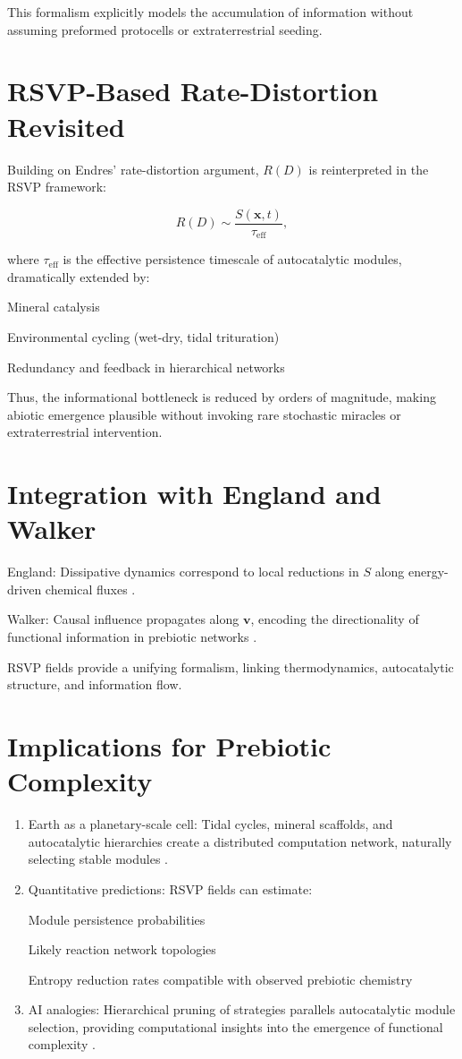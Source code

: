 \documentclass{book}
\begin{document}
This formalism explicitly models the accumulation of information without assuming preformed protocells or extraterrestrial seeding.

\section{RSVP-Based Rate-Distortion Revisited}
Building on Endres’ rate-distortion argument, $R(D)$ is reinterpreted in the RSVP framework:

\[R(D) \sim \frac{S(\mathbf{x}, t)}{\tau_{\mathrm{eff}}},\]

where $\tau_{\mathrm{eff}}$ is the effective persistence timescale of autocatalytic modules, dramatically extended by:

Mineral catalysis \citep{hazen2005}

Environmental cycling (wet-dry, tidal trituration)

Redundancy and feedback in hierarchical networks \citep{peng2022}

Thus, the informational bottleneck is reduced by orders of magnitude, making abiotic emergence plausible without invoking rare stochastic miracles or extraterrestrial intervention.

\section{Integration with England and Walker}
England: Dissipative dynamics correspond to local reductions in $S$ along energy-driven chemical fluxes \citep{england2015}.

Walker: Causal influence propagates along $\mathbf{v}$, encoding the directionality of functional information in prebiotic networks \citep{walker2017}.

RSVP fields provide a unifying formalism, linking thermodynamics, autocatalytic structure, and information flow.

\section{Implications for Prebiotic Complexity}
\begin{enumerate}
\item Earth as a planetary-scale cell: Tidal cycles, mineral scaffolds, and autocatalytic hierarchies create a distributed computation network, naturally selecting stable modules \citep{plum2025}.
\item Quantitative predictions: RSVP fields can estimate:

Module persistence probabilities

Likely reaction network topologies

Entropy reduction rates compatible with observed prebiotic chemistry \citep{sokolskyi2024}
\item AI analogies: Hierarchical pruning of strategies parallels autocatalytic module selection, providing computational insights into the emergence of functional complexity \citep{scalinghypothesis}.
\end{enumerate}
\end{document}

